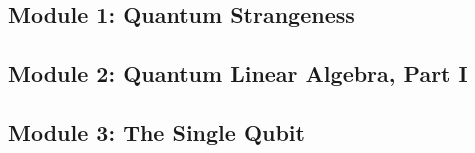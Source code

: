 \subsection{Module 1: Quantum Strangeness}


\subsection{Module 2: Quantum Linear Algebra, Part I}


\subsection{Module 3: The Single Qubit}










